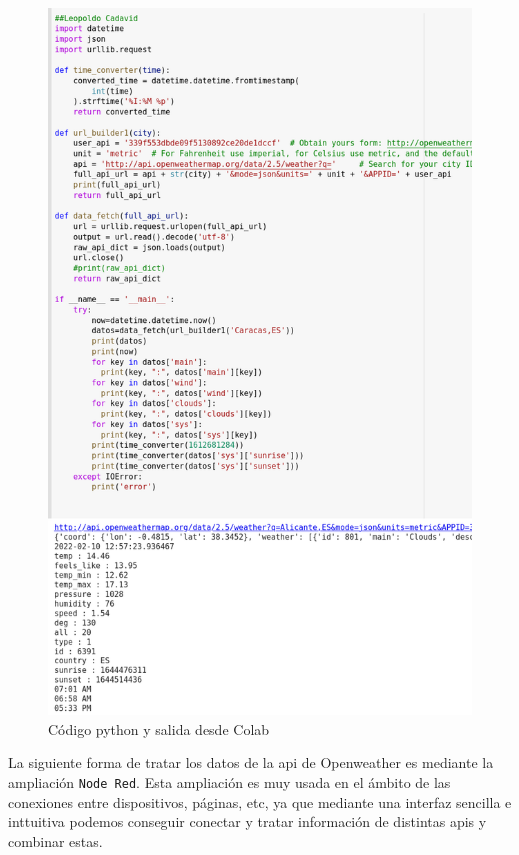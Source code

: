 \documentclass[12pt]{article}
\begin{document}
\begin{figure}[H]
    \centering
    \includegraphics[scale=0.3]{aliopencol.png}
    \caption{Código python y salida desde Colab}
    \label{fig: alicantecolab}
\end{figure}

La siguiente forma de tratar los datos de la api de Openweather es mediante la ampliación \verb|Node Red|. Esta ampliación es 
muy usada en el ámbito de las conexiones entre dispositivos, páginas, etc, ya que mediante una interfaz sencilla e inttuitiva podemos conseguir
conectar y tratar información de distintas apis y combinar estas.\\
\end{document}
